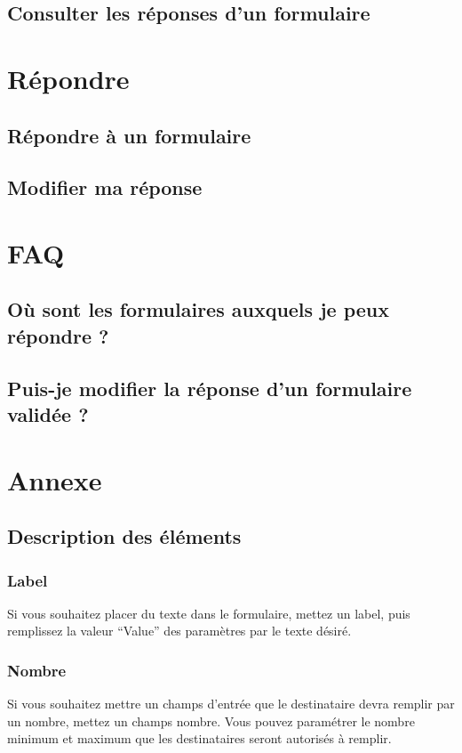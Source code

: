 \documentclass[a4paper,11pt,final]{report}
\begin{document}
\section{Consulter les réponses d'un formulaire}

\chapter{Répondre}
\section{Répondre à un formulaire}

\section{Modifier ma réponse}


\chapter{FAQ}
\section{Où sont les formulaires auxquels je peux répondre ?}
\section{Puis-je modifier la réponse d'un formulaire validée ?}

\chapter{Annexe}
\section{Description des éléments}
\subsection{Label}
Si vous souhaitez placer du texte dans le formulaire, mettez un label, puis remplissez la valeur ``Value'' des paramètres par le texte désiré.
\subsection{Nombre}
Si vous souhaitez mettre un champs d'entrée que le destinataire devra remplir par un nombre, mettez un champs nombre. Vous pouvez paramétrer le nombre minimum et maximum que les destinataires seront autorisés à remplir.
\end{document}

